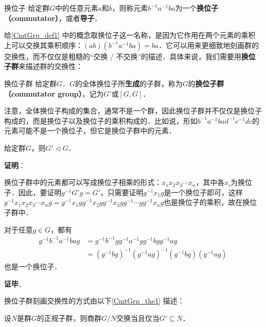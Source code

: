 


\begin{definition}{换位子}\label{CmtGrp_def1}
给定群$G$中的任意元素$a$和$b$，则称元素$b^{-1}a^{-1}ba$为一个\textbf{换位子（commutator）}，或者\textbf{导子}．
\end{definition}

给\autoref{CmtGrp_def1} 中的概念取换位子这一名称，是因为它作用在两个元素的乘积上可以交换其乘积顺序：$(ab)(b^{-1}a^{-1}ba)=ba$．它可以用来更细致地刻画群的交换性，而不仅仅是粗糙的“交换 / 不交换”的描述．具体来说，我们需要用\textbf{换位子群}来描述群的交换性：

\begin{definition}{换位子群}
给定群$G$．$G$的全体换位子所\textbf{生成}的子群，称为$G$的\textbf{换位子群（commutator group）}，记为$G'$或$[G, G]$．
\end{definition}

注意，全体换位子构成的集合，通常不是一个群，因此换位子群并不仅仅是换位子构成的，而是换位子以及换位子的乘积构成的．比如说，形如$b^{-1}a^{-1}bad^{-1}c^{-1}dc$的元素可能不是一个换位子，但它是换位子群中的元素．

\begin{theorem}{}
给定群$G$，则$G'\triangleleft G$．
\end{theorem}

\textbf{证明}：

换位子群中的元素都可以写成换位子相乘的形式：$x_1x_2x_3\cdots x_n$，其中各$x_i$为换位子．因此，要证明$g^{-1}G'g=G'$，只需要证明$g^{-1}x_1g$是一个换位子即可，这样$g^{-1}x_1x_2x_3\cdots x_ng=g^{-1}x_1gg^{-1}x_2gg^{-1}x_3gg^{-1}\cdots gg^{-1}x_ng$也是换位子的乘积，故在换位子群中．

对于任意$g\in G$，都有
\begin{equation}
\begin{aligned}
g^{-1}b^{-1}a^{-1}bag&=g^{-1}b^{-1}gg^{-1}a^{-1}gg^{-1}bgg^{-1}ag\\
&=(g^{-1}bg)^{-1}(g^{-1}ag)^{-1}(g^{-1}bg)(g^{-1}ag)
\end{aligned}
\end{equation}
也是一个换位子．

\textbf{证毕}．

换位子群刻画交换性的方式由以下\autoref{CmtGrp_the1} 描述：

\begin{theorem}{}\label{CmtGrp_the1}
设$N$是群$G$的正规子群，则商群$G/N$交换当且仅当$G'\subseteq N$．
\end{theorem}

